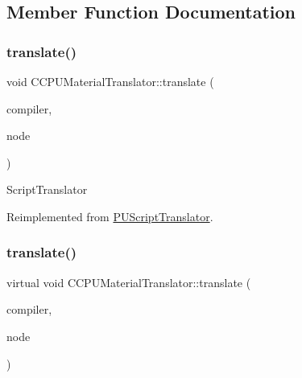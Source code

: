 \subsection{Member Function Documentation}
\mbox{\label{classCCPUMaterialTranslator_ab532137abdb524d58e5187d6e7155d59}} 
\subsubsection{\texorpdfstring{translate()}{translate()}\hspace{0.1cm}{\footnotesize\ttfamily [1/2]}}
{\footnotesize\ttfamily void C\+C\+P\+U\+Material\+Translator\+::translate (\begin{DoxyParamCaption}\item[{\hyperlink{classPUScriptCompiler}{P\+U\+Script\+Compiler} $\ast$}]{compiler,  }\item[{\hyperlink{classPUAbstractNode}{P\+U\+Abstract\+Node} $\ast$}]{node }\end{DoxyParamCaption})\hspace{0.3cm}{\ttfamily [virtual]}}

Script\+Translator 

Reimplemented from \hyperlink{classPUScriptTranslator_a9ff2cdfda9ea8db6fd716e7b69dbe79b}{P\+U\+Script\+Translator}.

\mbox{\label{classCCPUMaterialTranslator_ac581cd1f8f91af246942215069369ed3}} 
\subsubsection{\texorpdfstring{translate()}{translate()}\hspace{0.1cm}{\footnotesize\ttfamily [2/2]}}
{\footnotesize\ttfamily virtual void C\+C\+P\+U\+Material\+Translator\+::translate (\begin{DoxyParamCaption}\item[{\hyperlink{classPUScriptCompiler}{P\+U\+Script\+Compiler} $\ast$}]{compiler,  }\item[{\hyperlink{classPUAbstractNode}{P\+U\+Abstract\+Node} $\ast$}]{node }\end{DoxyParamCaption})\hspace{0.3cm}{\ttfamily [virtual]}}

